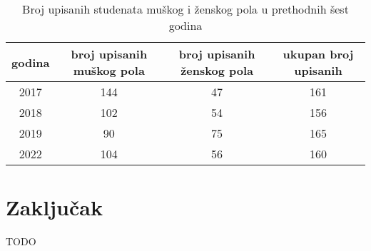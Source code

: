 \documentclass[a4paper]{article}
\begin{document}
\begin{table}[h!]
\begin{center}
\caption{Broj upisanih studenata muškog i ženskog pola u prethodnih šest godina}

\begin{tabular}{|c|c|c|c|} \hline
godina&broj upisanih muškog pola& broj upisanih ženskog pola & ukupan broj upisanih\\ \hline
2017&144&47&161\\ \hline
2018&102&54&156\\ \hline
2019&90&75&165\\ \hline
2022&104&56&160\\ \hline

\end{tabular}
\label{tab:tabela1}
\end{center}
\end{table}






\section{Zaključak}
\label{sec:zakljucak}

TODO


\appendix
 


\appendix
\end{document}
